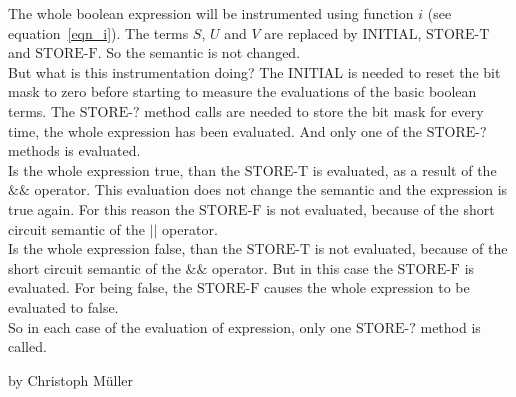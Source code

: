The whole boolean expression will be instrumented using function $i$ (see equation~\eqref{eqn_i}). The terms $S$, $U$ and $V$ are replaced by $\text{INITIAL}$, $\text{STORE-T}$ and $\text{STORE-F}$. So the semantic is not changed. \\
But what is this instrumentation doing? The $\text{INITIAL}$ is needed to reset the bit mask to zero before starting to measure the evaluations of the basic boolean terms. The $\text{STORE-?}$ method calls are needed to store the bit mask for every time, the whole expression has been evaluated. And only one of the $\text{STORE-?}$ methods is evaluated. \\
Is the whole \depAo{}expression\depAc{} true, than the $\text{STORE-T}$ is evaluated, as a result of the $\&\&$ operator. This evaluation does not change the semantic and the expression is true again. For this reason the $\text{STORE-F}$ is not evaluated, because of the short circuit semantic of the $||$ operator.\\
Is the whole \depAo{}expression\depAc{} false, than the $\text{STORE-T}$ is not evaluated, because of the short circuit semantic of the $\&\&$ operator. But in this case the $\text{STORE-F}$ is evaluated. For being false, the $\text{STORE-F}$ causes the whole expression to be evaluated to false.\\
So in each case of the evaluation of \depAo{}expression\depAc{}, only one $\text{STORE-?}$ method is called.

\vfill{}
by Christoph Müller